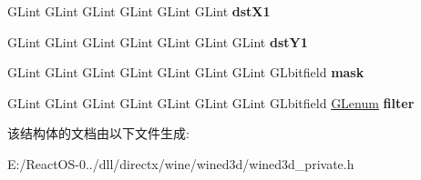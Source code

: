 \begin{DoxyCompactItemize}
G\+Lint G\+Lint G\+Lint G\+Lint G\+Lint G\+Lint {\bfseries dst\+X1}
\item 
\mbox{\label{structwined3d__fbo__ops_a20d23c136e41446f4cc4ad07a1b4584d}} 
G\+Lint G\+Lint G\+Lint G\+Lint G\+Lint G\+Lint G\+Lint {\bfseries dst\+Y1}
\item 
\mbox{\label{structwined3d__fbo__ops_af7219e0bf49ee9c7ebf0fda91e8c6e42}} 
G\+Lint G\+Lint G\+Lint G\+Lint G\+Lint G\+Lint G\+Lint G\+Lbitfield {\bfseries mask}
\item 
\mbox{\label{structwined3d__fbo__ops_a3daefaeff4cdc55cd751c40d89b0f7d6}} 
G\+Lint G\+Lint G\+Lint G\+Lint G\+Lint G\+Lint G\+Lint G\+Lbitfield \hyperlink{interfacevoid}{G\+Lenum} {\bfseries filter}
\end{DoxyCompactItemize}


该结构体的文档由以下文件生成\+:\begin{DoxyCompactItemize}
\item 
E\+:/\+React\+O\+S-\/0../dll/directx/wine/wined3d/wined3d\+\_\+private.\+h\end{DoxyCompactItemize}
